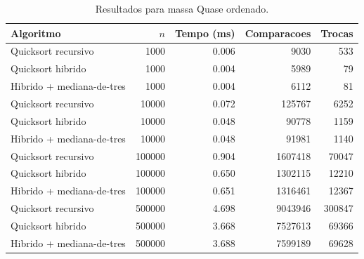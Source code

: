 \begin{table}[H]
\centering
\caption{Resultados para massa Quase ordenado.}
\label{tab:quase_ordenado}
\begin{tabular}{lrrrr}
\hline
Algoritmo & $n$ & Tempo (ms) & Comparacoes & Trocas \\
\hline
Quicksort recursivo & 1000 & 0.006 & 9030 & 533 \\
Quicksort hibrido & 1000 & 0.004 & 5989 & 79 \\
Hibrido + mediana-de-tres & 1000 & 0.004 & 6112 & 81 \\
Quicksort recursivo & 10000 & 0.072 & 125767 & 6252 \\
Quicksort hibrido & 10000 & 0.048 & 90778 & 1159 \\
Hibrido + mediana-de-tres & 10000 & 0.048 & 91981 & 1140 \\
Quicksort recursivo & 100000 & 0.904 & 1607418 & 70047 \\
Quicksort hibrido & 100000 & 0.650 & 1302115 & 12210 \\
Hibrido + mediana-de-tres & 100000 & 0.651 & 1316461 & 12367 \\
Quicksort recursivo & 500000 & 4.698 & 9043946 & 300847 \\
Quicksort hibrido & 500000 & 3.668 & 7527613 & 69366 \\
Hibrido + mediana-de-tres & 500000 & 3.688 & 7599189 & 69628 \\
\hline
\end{tabular}
\end{table}
